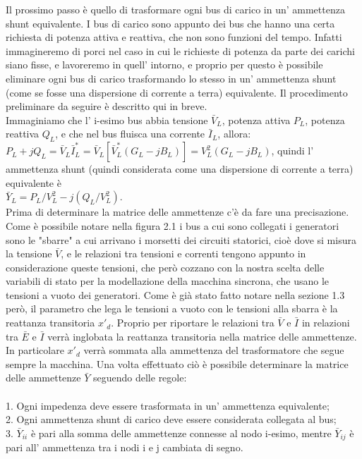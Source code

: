 \documentclass[Lau,noexaminfo]{sapthesis}
\begin{document}
	Il prossimo passo è quello di trasformare ogni bus di carico in un' ammettenza shunt equivalente. I bus di carico sono appunto dei bus che hanno una certa richiesta di potenza attiva e reattiva, che non sono funzioni del tempo. Infatti immagineremo di porci nel caso in cui le richieste di potenza da parte dei carichi siano fisse, e lavoreremo in quell' intorno, e proprio per questo è possibile eliminare ogni bus di carico trasformando lo stesso in un' ammettenza shunt (come se fosse una dispersione di corrente a terra) equivalente. Il procedimento preliminare da seguire è descritto qui in breve.\\
	Immaginiamo che l' i-esimo bus abbia tensione $\bar{V}_L$, potenza attiva $P_L$, potenza reattiva $Q_L$, e che nel bus fluisca una corrente $\bar{I}_L$, allora:\\
	$P_L+jQ_L=\bar{V}_L\bar{I}^*_L=\bar{V}_L[\bar{V}^*_L(G_L-jB_L)]=V_L^2(G_L-jB_L)$, quindi l' ammettenza shunt (quindi considerata come una dispersione di corrente a terra) equivalente è\\
	$\bar{Y}_L=P_L/V^2_L-j(Q_L/V^2_L)$.\\
	Prima di determinare la matrice delle ammettenze c'è da fare una precisazione. Come è possibile notare nella figura 2.1 i bus a cui sono collegati i generatori sono le "sbarre" a cui arrivano i morsetti dei circuiti statorici, cioè dove si misura la tensione $\bar{V}$, e le relazioni tra tensioni e correnti tengono appunto in considerazione queste tensioni, che però cozzano con la nostra scelta delle variabili di stato per la modellazione della macchina sincrona, che usano le tensioni a vuoto dei generatori. Come è già stato fatto notare nella sezione 1.3 però, il parametro che lega le tensioni a vuoto con le tensioni alla sbarra è la reattanza transitoria $x'_d$. Proprio per riportare le relazioni tra $\bar{V}$ e $\bar{I}$ in relazioni tra $\bar{E}$ e $\bar{I}$ verrà inglobata la reattanza transitoria nella matrice delle ammettenze. In particolare $x'_d$ verrà sommata alla ammettenza del trasformatore che segue sempre la macchina.
	Una volta effettuato ciò è possibile determinare la matrice delle ammettenze $\bar{Y}$ seguendo delle regole:\\\\
	1. Ogni impedenza deve essere trasformata in un' ammettenza equivalente;\\
	2. Ogni ammettenza shunt di carico deve essere considerata collegata al bus;\\
	3. $\bar{Y}_{ii}$ è pari alla somma delle ammettenze connesse al nodo i-esimo, mentre $\bar{Y}_{ij}$ è pari all' ammettenza tra i nodi i e j cambiata di segno.\\
\end{document}
